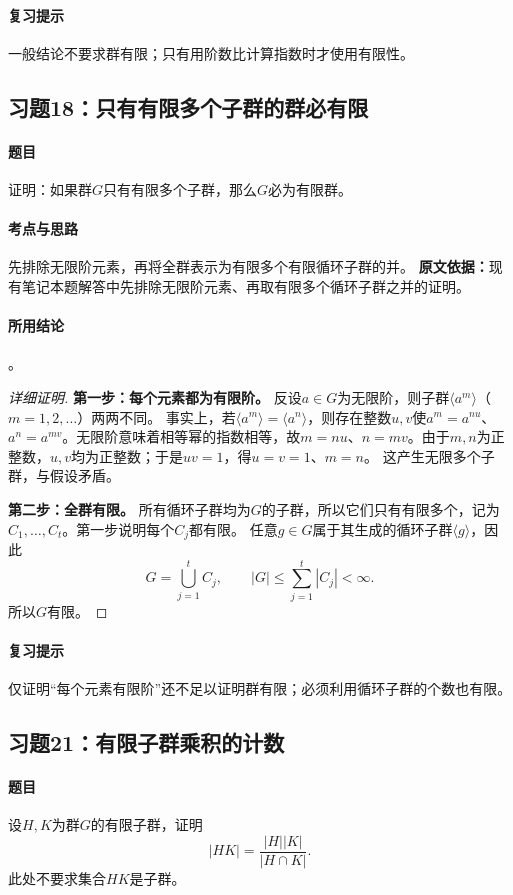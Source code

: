 \paragraph{复习提示}
一般结论不要求群有限；只有用阶数比计算指数时才使用有限性。

\subsection{习题18：只有有限多个子群的群必有限}
\paragraph{题目}
证明：如果群$G$只有有限多个子群，那么$G$必为有限群。
\paragraph{考点与思路}
先排除无限阶元素，再将全群表示为有限多个有限循环子群的并。
\textbf{原文依据：}现有笔记本题解答中先排除无限阶元素、再取有限多个循环子群之并的证明。
\paragraph{所用结论}
。
\begin{proof}[详细证明]
\textbf{第一步：每个元素都为有限阶。}
反设$a\in G$为无限阶，则子群$\langle a^m\rangle$（$m=1,2,\ldots$）两两不同。
事实上，若$\langle a^m\rangle=\langle a^n\rangle$，则存在整数$u,v$使$a^m=a^{nu}$、$a^n=a^{mv}$。无限阶意味着相等幂的指数相等，故$m=nu$、$n=mv$。由于$m,n$为正整数，$u,v$均为正整数；于是$uv=1$，得$u=v=1$、$m=n$。
这产生无限多个子群，与假设矛盾。

\textbf{第二步：全群有限。}
所有循环子群均为$G$的子群，所以它们只有有限多个，记为$C_1,\ldots,C_t$。第一步说明每个$C_j$都有限。
任意$g\in G$属于其生成的循环子群$\langle g\rangle$，因此
\[
G=\bigcup_{j=1}^{t}C_j,\qquad |G|\leq\sum_{j=1}^{t}|C_j|<\infty.
\]
所以$G$有限。
\end{proof}
\paragraph{复习提示}
仅证明“每个元素有限阶”还不足以证明群有限；必须利用循环子群的个数也有限。

\subsection{习题21：有限子群乘积的计数}
\paragraph{题目}
设$H,K$为群$G$的有限子群，证明
\[
|HK|=\frac{|H||K|}{|H\cap K|}.
\]
此处不要求集合$HK$是子群。
